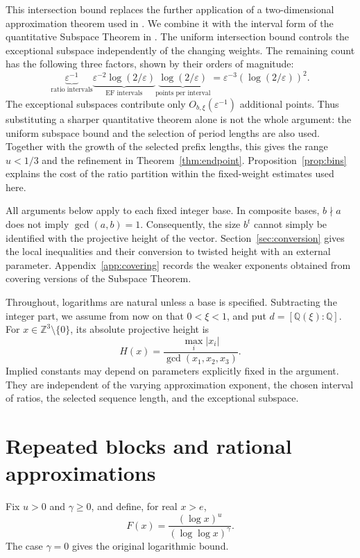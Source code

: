 \documentclass[11pt]{article}
\numberwithin{equation}{section}
\theoremstyle{remark}
\newcommand{\Q}{\mathbb Q}
\newcommand{\Z}{\mathbb Z}
\newcommand{\eps}{\varepsilon}
\begin{document}
This intersection bound replaces the further application of a
two-dimensional approximation theorem used in \cite[\S7]{BE08}.
We combine it with the interval form of the quantitative Subspace
Theorem in \cite[Theorem~2.3]{EF13}. The uniform intersection bound
controls the exceptional subspace independently of the changing weights.
The remaining count has the following three factors, shown by their
orders of magnitude:
\[
 \underbrace{\eps^{-1}}_{\text{ratio intervals}}
 \underbrace{\eps^{-2}\log(2/\eps)}_{\text{EF intervals}}
 \underbrace{\log(2/\eps)}_{\text{points per interval}}
 =\eps^{-3}(\log(2/\eps))^2.
\]
The exceptional subspaces contribute only $O_{b,\xi}(\eps^{-1})$
additional points. Thus substituting a sharper quantitative theorem
alone is not the whole argument: the uniform subspace bound and the
selection of period lengths are also used.
Together with the growth of the selected prefix lengths, this gives
the range $u<1/3$ and the refinement in Theorem~\ref{thm:endpoint}.
Proposition~\ref{prop:bins} explains the cost of the ratio partition
within the fixed-weight estimates used here.

All arguments below apply to each fixed integer base. In composite bases,
$b\nmid a$ does not imply $\gcd(a,b)=1$. Consequently, the size $b^t$
cannot simply be identified with the projective height of the vector.
Section~\ref{sec:conversion} gives the local inequalities and their
conversion to twisted height with an external parameter.
Appendix~\ref{app:covering} records the weaker exponents obtained from
covering versions of the Subspace Theorem.

Throughout, logarithms are natural unless a base is specified.
Subtracting the integer part, we assume from now on that $0<\xi<1$,
and put $d=[\Q(\xi):\Q]$. For $x\in\Z^3\setminus\{0\}$, its absolute
projective height is
\[
 H(x)=\frac{\max_i|x_i|}{\gcd(x_1,x_2,x_3)}.
\]
Implied constants may depend on parameters explicitly fixed in the
argument. They are independent of the varying approximation exponent,
the chosen interval of ratios, the selected sequence length, and the
exceptional subspace.

\section{Repeated blocks and rational approximations}\label{sec:repetitions}

Fix $u>0$ and $\gamma\ge0$, and define, for real $x>e$,
\begin{equation}\label{eq:envelope}
 F(x)=\frac{(\log x)^u}{(\log\log x)^\gamma}.
\end{equation}
The case $\gamma=0$ gives the original logarithmic bound.
\end{document}
